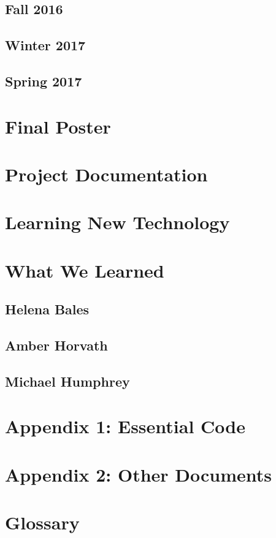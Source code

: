 \documentclass[letterpaper,10pt]{article}
\begin{document}
\subsection{Fall 2016}


\subsection{Winter 2017}


\subsection{Spring 2017}


\clearpage
\section{Final Poster}
\clearpage 

\section{Project Documentation}


\section{Learning New Technology}


\section{What We Learned}
\subsection{Helena Bales}

\subsection{Amber Horvath}

\subsection{Michael Humphrey}


\section{Appendix 1: Essential Code}


\section{Appendix 2: Other Documents}


\section{Glossary}
\glsaddall
\printglossaries
\end{document}
